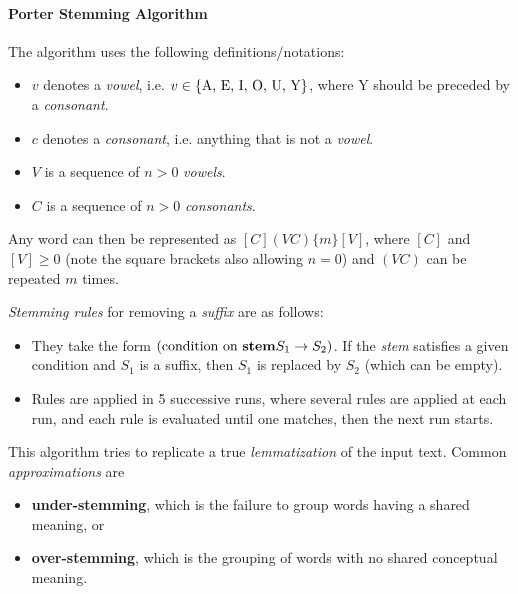 \paragraph{Porter Stemming Algorithm}
The algorithm uses the following definitions/notations:
\begin{itemize}
	\item \(v\) denotes a \emph{vowel}, i.e. \(v \in \{\textnormal{A, E, I, O, U, Y}\}\), where Y should be preceded by a \emph{consonant}.
	\item \(c\) denotes a \emph{consonant}, i.e. anything that is not a \emph{vowel}.
	\item \(V\) is a sequence of \(n > 0\) \emph{vowels}.
	\item \(C\) is a sequence of \(n > 0\) \emph{consonants}.
\end{itemize}
Any word can then be represented as \([C](VC)\{m\}[V]\), where \([C]\) and \([V] \geq 0\) (note the square brackets also allowing \(n = 0\)) and \((VC)\) can be repeated \(m\) times.

\emph{Stemming rules} for removing a \emph{suffix} are as follows:
\begin{itemize}
	\item They take the form \((\textnormal{condition on \textbf{stem}}S_1 \to S_2)\). If the \emph{stem} satisfies a given condition and \(S_1\) is a suffix, then \(S_1\) is replaced by \(S_2\) (which can be empty).
	\item Rules are applied in 5 successive runs, where several rules are applied at each run, and each rule is evaluated until one matches, then the next run starts.
\end{itemize}

This algorithm tries to replicate a true \emph{lemmatization} of the input text.
Common \emph{approximations} are
\begin{itemize}
	\item \textbf{under-stemming}, which is the failure to group words having a shared meaning, or
	\item \textbf{over-stemming}, which is the grouping of words with no shared conceptual meaning.
\end{itemize}

